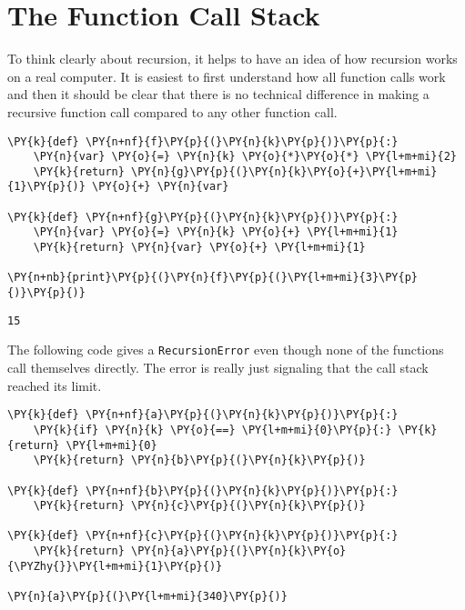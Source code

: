 \section{The Function Call Stack}


To think clearly about recursion, it helps to have an idea of how recursion works on a real computer.
It is easiest to first understand how all function calls work and then it should be clear that there is no technical difference in making a recursive function call compared to any other function call.


\begin{Verbatim}[commandchars=\\\{\}]
\PY{k}{def} \PY{n+nf}{f}\PY{p}{(}\PY{n}{k}\PY{p}{)}\PY{p}{:}
    \PY{n}{var} \PY{o}{=} \PY{n}{k} \PY{o}{*}\PY{o}{*} \PY{l+m+mi}{2}
    \PY{k}{return} \PY{n}{g}\PY{p}{(}\PY{n}{k}\PY{o}{+}\PY{l+m+mi}{1}\PY{p}{)} \PY{o}{+} \PY{n}{var}

\PY{k}{def} \PY{n+nf}{g}\PY{p}{(}\PY{n}{k}\PY{p}{)}\PY{p}{:}
    \PY{n}{var} \PY{o}{=} \PY{n}{k} \PY{o}{+} \PY{l+m+mi}{1}
    \PY{k}{return} \PY{n}{var} \PY{o}{+} \PY{l+m+mi}{1}

\PY{n+nb}{print}\PY{p}{(}\PY{n}{f}\PY{p}{(}\PY{l+m+mi}{3}\PY{p}{)}\PY{p}{)}
\end{Verbatim}

\begin{Verbatim}
15

\end{Verbatim}


The following code gives a \texttt{RecursionError} even though none of the functions call themselves directly.
The error is really just signaling that the call stack reached its limit.

\begin{Verbatim}[commandchars=\\\{\}]
\PY{k}{def} \PY{n+nf}{a}\PY{p}{(}\PY{n}{k}\PY{p}{)}\PY{p}{:}
    \PY{k}{if} \PY{n}{k} \PY{o}{==} \PY{l+m+mi}{0}\PY{p}{:} \PY{k}{return} \PY{l+m+mi}{0}
    \PY{k}{return} \PY{n}{b}\PY{p}{(}\PY{n}{k}\PY{p}{)}

\PY{k}{def} \PY{n+nf}{b}\PY{p}{(}\PY{n}{k}\PY{p}{)}\PY{p}{:}
    \PY{k}{return} \PY{n}{c}\PY{p}{(}\PY{n}{k}\PY{p}{)}

\PY{k}{def} \PY{n+nf}{c}\PY{p}{(}\PY{n}{k}\PY{p}{)}\PY{p}{:}
    \PY{k}{return} \PY{n}{a}\PY{p}{(}\PY{n}{k}\PY{o}{\PYZhy{}}\PY{l+m+mi}{1}\PY{p}{)}

\PY{n}{a}\PY{p}{(}\PY{l+m+mi}{340}\PY{p}{)}
\end{Verbatim}



